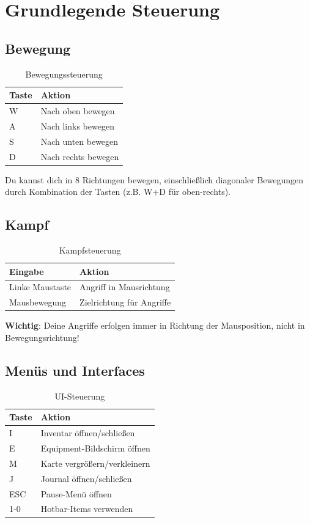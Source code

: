 \documentclass[
  a4paper,
  11pt,
  ngerman,
  parskip=half,
  bibliography=totoc,
  listof=totoc
]{scrreprt}
\begin{document}
\section{Grundlegende Steuerung}

\subsection{Bewegung}

\begin{table}[h]
\centering
\caption{Bewegungssteuerung}
\label{tab:movement_controls}
\begin{tabular}{|l|l|}
\hline
\textbf{Taste} & \textbf{Aktion} \\
\hline
W & Nach oben bewegen \\
A & Nach links bewegen \\
S & Nach unten bewegen \\
D & Nach rechts bewegen \\
\hline
\end{tabular}
\end{table}

Du kannst dich in 8 Richtungen bewegen, einschließlich diagonaler Bewegungen durch Kombination der Tasten (z.B. W+D für oben-rechts).

\subsection{Kampf}

\begin{table}[h]
\centering
\caption{Kampfsteuerung}
\label{tab:combat_controls}
\begin{tabular}{|l|l|}
\hline
\textbf{Eingabe} & \textbf{Aktion} \\
\hline
Linke Maustaste & Angriff in Mausrichtung \\
Mausbewegung & Zielrichtung für Angriffe \\
\hline
\end{tabular}
\end{table}

\textbf{Wichtig}: Deine Angriffe erfolgen immer in Richtung der Mausposition, nicht in Bewegungsrichtung!

\subsection{Menüs und Interfaces}

\begin{table}[h]
\centering
\caption{UI-Steuerung}
\label{tab:ui_controls}
\begin{tabular}{|l|l|}
\hline
\textbf{Taste} & \textbf{Aktion} \\
\hline
I & Inventar öffnen/schließen \\
E & Equipment-Bildschirm öffnen \\
M & Karte vergrößern/verkleinern \\
J & Journal öffnen/schließen \\
ESC & Pause-Menü öffnen \\
1-0 & Hotbar-Items verwenden \\
\hline
\end{tabular}
\end{table}
\end{document}
